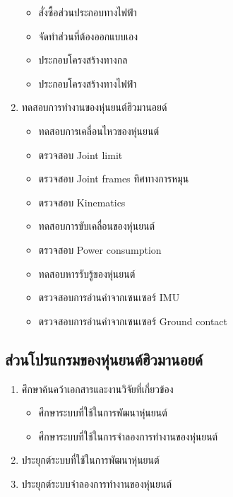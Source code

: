 \begin{enumerate}[label=\arabic*, leftmargin=1.5cm]
\begin{itemize}
		\item สั่งซื้อส่วนประกอบทางไฟฟ้า
		\item จัดทำส่วนที่ต้องออกแบบเอง
		\item ประกอบโครงสร้างทางกล
		\item ประกอบโครงสร้างทางไฟฟ้า
	\end{itemize}
	\item ทดสอบการทำงานของหุ่นยนต์ฮิวมานอยด์
	\begin{itemize}\setlength\itemsep{-0.3em}
		\item ทดสอบการเคลื่อนไหวของหุ่นยนต์
		\item ตรวจสอบ Joint limit
		\item ตรวจสอบ Joint frames ทิศทางการหมุน
		\item ตรวจสอบ Kinematics
		\item ทดสอบการขับเคลื่อนของหุ่นยนต์
		\item ตรวจสอบ Power consumption
		\item ทดสอบหารรับรู้ของหุ่นยนต์
		\item ตรวจสอบการอ่านค่าจากเซนเซอร์ IMU
		\item ตรวจสอบการอ่านค่าจากเซนเซอร์ Ground contact
	\end{itemize}

\end{enumerate}

\subsection{ส่วนโปรแกรมของหุ่นยนต์ฮิวมานอยด์}
\begin{enumerate}[label=\arabic*, leftmargin=1.5cm]
	\item ศึกษาค้นคว้าเอกสารและงานวิจัยที่เกี่ยวข้อง
	\begin{itemize}\setlength\itemsep{-0.3em}
		\item ศึกษาระบบที่ใช้ในการพัฒนาหุ่นยนต์
		\item ศึกษาระบบที่ใช้ในการจำลองการทำงานของหุ่นยนต์
	\end{itemize}
	\item ประยุกต์ระบบที่ใช้ในการพัฒนาหุ่นยนต์
	\item ประยุกต์ระบบจำลองการทำงานของหุ่นยนต์
\end{enumerate}

